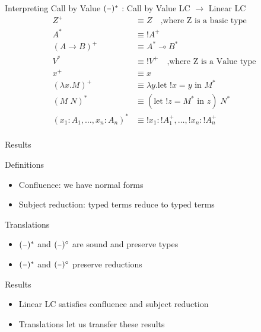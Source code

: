 \documentclass[10pt]{beamer}
\newcommand{\lam}[2]{\lambda #1 . #2}
\newcommand{\llet}[3]{\text{let }  ! #1 = #2 \text{ in } #3}
\newcommand{\app}[2]{#1 \; #2}
\newcommand{\minus}{\scalebox{0.75}[1.0]{$-$}}
\begin{document}
\begin{frame}[fragile]{Interpreting Call by Value}
  $(\minus)^*$ : Call by Value LC $\to$ Linear LC\\

  \begin{align*}
    Z^+                             & \equiv Z \quad \text{,where Z is a basic type}     \\
    A^*                             & \equiv ! A^+                                       \\
    (A \rightarrow B)^+             & \equiv A^* \multimap B^*                           \\
    V^*                             & \equiv ! V^+ \quad \text{,where Z is a Value type} \\
    x^+                             & \equiv x                                           \\
    (\lam{x}{M})^+                  & \equiv \lam{y}{\llet{x}{y}{M^*}}                   \\
    (\app{M}{N})^*                  & \equiv \app{(\llet{z}{M^*}{z})}{N^*}               \\
    (x_1 : A_1, \dots, x_n : A_n)^* & \equiv ! x_1 : ! A_1^+, \dots, ! x_n : ! A_n^+     \\
  \end{align*}
\end{frame}

\begin{frame}[fragile]{Results}

  \begin{alertblock}{Definitions}
    \begin{itemize}
      \item Confluence: we have normal forms
      \item Subject reduction: typed terms reduce to typed terms
    \end{itemize}
  \end{alertblock}

  \begin{alertblock}{Translations}
    \begin{itemize}
      \item $(\minus)^*$ and $(\minus)^\circ$ are sound and preserve types
      \item $(\minus)^*$ and $(\minus)^\circ$ preserve reductions
    \end{itemize}
  \end{alertblock}

  \begin{alertblock}{Results}
    \begin{itemize}
      \item Linear LC satisfies confluence and subject reduction
      \item Translations let us transfer these results
    \end{itemize}
  \end{alertblock}
\end{frame}
\end{document}
